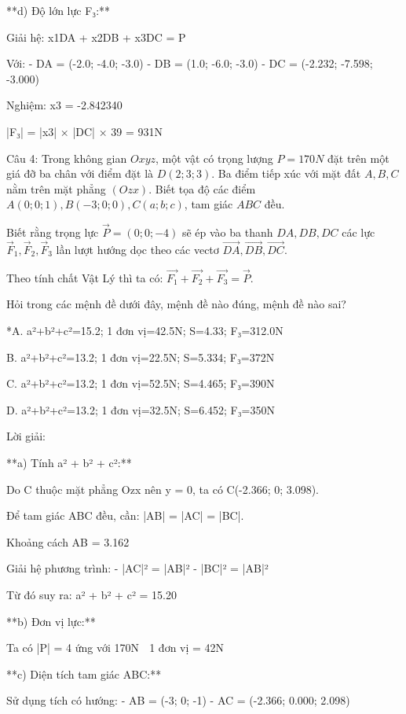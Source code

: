 \documentclass[a4paper,12pt]{article}
\begin{document}
**d) Độ lớn lực F₃:**

Giải hệ: x1DA⃗ + x2DB⃗ + x3DC⃗ = P⃗

Với:
- DA⃗ = (-2.0; -4.0; -3.0)
- DB⃗ = (1.0; -6.0; -3.0)
- DC⃗ = (-2.232; -7.598; -3.000)

Nghiệm: x3 = -2.842340

|F₃| = |x3| × |DC⃗| × 39 = 931N




Câu 4: Trong không gian \(Oxyz\), một vật có trọng lượng \(P=170N\) đặt trên một giá đỡ ba chân với điểm đặt là \(D(2; 3; 3)\). Ba điểm tiếp xúc với mặt đất \(A, B, C\) nằm trên mặt phẳng \((Ozx)\). Biết tọa độ các điểm \(A(0; 0; 1), B(-3; 0; 0), C(a; b; c)\), tam giác \(ABC\) đều. 

Biết rằng trọng lực \(\overrightarrow{P}=(0; 0; -4)\) sẽ ép vào ba thanh \(DA, DB, DC\) các lực \(\overrightarrow{F}_1, \overrightarrow{F}_2, \overrightarrow{F}_3\) lần lượt hướng dọc theo các vectơ \(\overrightarrow{DA}, \overrightarrow{DB}, \overrightarrow{DC}\). 

Theo tính chất Vật Lý thì ta có: \(\overrightarrow{F_1}+\overrightarrow{F_2}+\overrightarrow{F_3}=\overrightarrow{P}\).

Hỏi trong các mệnh đề dưới đây, mệnh đề nào đúng, mệnh đề nào sai?

*A. a²+b²+c²=15.2; 1 đơn vị=42.5N; S=4.33; F₃=312.0N

B. a²+b²+c²=13.2; 1 đơn vị=22.5N; S=5.334; F₃=372N

C. a²+b²+c²=13.2; 1 đơn vị=52.5N; S=4.465; F₃=390N

D. a²+b²+c²=13.2; 1 đơn vị=32.5N; S=6.452; F₃=350N

Lời giải:


**a) Tính a² + b² + c²:**

Do C thuộc mặt phẳng Ozx nên y = 0, ta có C(-2.366; 0; 3.098).

Để tam giác ABC đều, cần: |AB| = |AC| = |BC|.

Khoảng cách AB = 3.162

Giải hệ phương trình:
- |AC|² = |AB|²  
- |BC|² = |AB|²

Từ đó suy ra: a² + b² + c² = 15.20

**b) Đơn vị lực:**

Ta có |P⃗| = 4 ứng với 170N
⟹ 1 đơn vị = 42N

**c) Diện tích tam giác ABC:**

Sử dụng tích có hướng:
- AB⃗ = (-3; 0; -1)
- AC⃗ = (-2.366; 0.000; 2.098)
\end{document}
